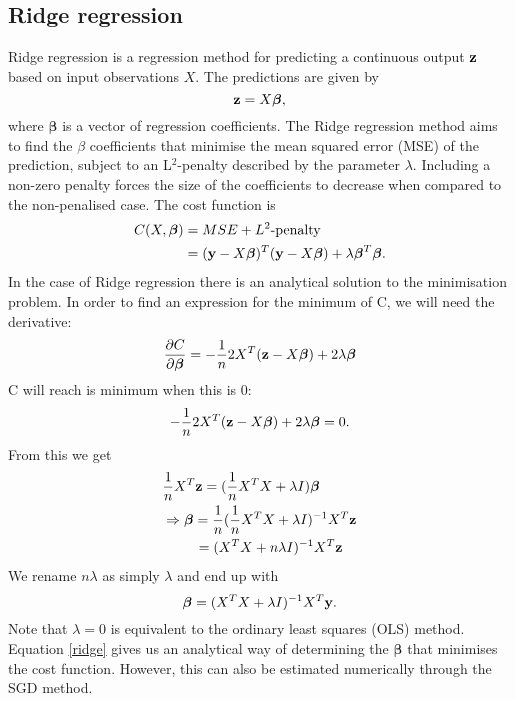 \documentclass[notitlepage, reprint, nofootinbib]{revtex4-1}
\begin{document}
\subsection{Ridge regression}
Ridge regression is a regression method for predicting a continuous output $\vb{z}$ based on input observations $X$. The predictions are given by 
\begin{equation} \vb{z}=X\boldsymbol{\beta},\end{equation} 
where $\boldsymbol{\beta}$ is a vector of regression coefficients. The Ridge regression method aims to find the $\beta$ coefficients that minimise the mean squared error (MSE) of the prediction, subject to an L$^2$-penalty described by the parameter $\lambda$. Including a non-zero penalty forces the size of the coefficients to decrease when compared to the non-penalised case. The cost function is 
\begin{align}
	C(X,\boldsymbol{\beta})&=MSE+L^2\text{-penalty}\\
	&=(\vb{y}-X\boldsymbol{\beta})^T(\vb{y}-X\boldsymbol{\beta})+\lambda\boldsymbol{\beta}^T\boldsymbol{\beta}.
\end{align}
In the case of Ridge regression there is an analytical solution to the minimisation problem. In order to find an expression for the minimum of C, we will need the derivative:
$$\pdv{C}{\boldsymbol{\beta}}=-\frac{1}{n}2X^T(\vb{z}-X\boldsymbol{\beta})+2\lambda\boldsymbol{\beta}$$
C will reach is minimum when this is 0:
$$-\frac{1}{n}2X^T(\vb{z}-X\boldsymbol{\beta})+2\lambda\boldsymbol{\beta}=0.$$
From this we get
\begin{align*}
	&\frac{1}{n}X^T\vb{z}=(\frac{1}{n}X^TX+\lambda I)\boldsymbol{\beta}\\
	&\Rightarrow \boldsymbol{\beta}=\frac{1}{n}(\frac{1}{n}X^TX+\lambda I)^{-1}X^T\vb{z}\\
	&\quad\quad\  =(X^TX+n\lambda I)^{-1}X^T\vb{z}
\end{align*}
We rename $n\lambda$ as simply $\lambda$ and end up with 
\begin{equation}\label{ridge}\boldsymbol{\beta}=(X^TX+\lambda I)^{-1}X^T\vb{y}.\end{equation}
Note that $\lambda=0$ is equivalent to the ordinary least squares (OLS) method. \\[2mm]
Equation \ref{ridge} gives us an analytical way of determining the $\boldsymbol{\beta}$ that minimises the cost function. However, this can also be estimated numerically through the SGD method.
\end{document}
